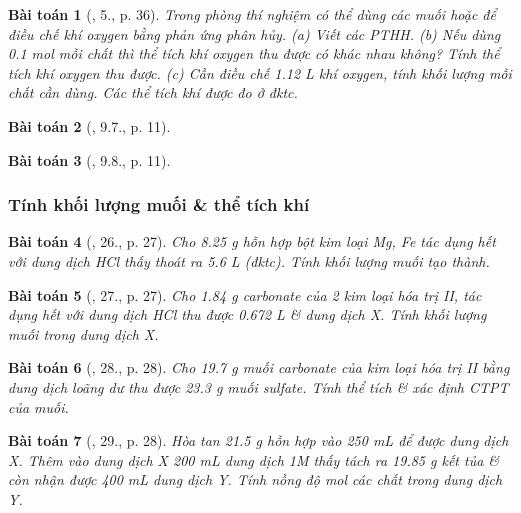 \documentclass{article}
\newtheorem{baitoan}{Bài toán}
\begin{document}
\begin{baitoan}[\cite{SGK_Hoa_Hoc_9}, 5., p. 36]
	Trong phòng thí nghiệm có thể dùng các muối \emph{} hoặc \emph{} để điều chế khí oxygen bằng phản ứng phân hủy. (a) Viết các PTHH. (b) Nếu dùng \emph{0.1 mol} mỗi chất thì thể tích khí oxygen thu được có khác nhau không? Tính thể tích khí oxygen thu được. (c) Cần điều chế \emph{1.12 L} khí oxygen, tính khối lượng mỗi chất cần dùng. Các thể tích khí được đo ở đktc.
\end{baitoan}

\begin{baitoan}[\cite{SBT_Hoa_Hoc_9}, 9.7., p. 11]
	
\end{baitoan}

\begin{baitoan}[\cite{SBT_Hoa_Hoc_9}, 9.8., p. 11]
	
\end{baitoan}

\subsubsection{Tính khối lượng muối \& thể tích khí }

\begin{baitoan}[\cite{An_350_BT_Hoa_Hoc_9}, 26., p. 27]
	Cho \emph{8.25 g} hỗn hợp bột kim loại \emph{Mg, Fe} tác dụng hết với dung dịch \emph{HCl} thấy thoát ra \emph{5.6 L } (đktc). Tính khối lượng muối tạo thành.
\end{baitoan}

\begin{baitoan}[\cite{An_350_BT_Hoa_Hoc_9}, 27., p. 27]
	Cho \emph{1.84 g} carbonate của 2 kim loại hóa trị II, tác dụng hết với dung dịch \emph{HCl} thu được \emph{0.672 L } \& dung dịch X. Tính khối lượng muối trong dung dịch X.
\end{baitoan}

\begin{baitoan}[\cite{An_350_BT_Hoa_Hoc_9}, 28., p. 28]
	Cho \emph{19.7 g} muối carbonate của kim loại hóa trị II bằng dung dịch \emph{} loãng dư thu được \emph{23.3 g} muối sulfate. Tính thể tích \emph{} \& xác định CTPT của muối.
\end{baitoan}

\begin{baitoan}[\cite{An_350_BT_Hoa_Hoc_9}, 29., p. 28]
	Hòa tan \emph{21.5 g} hỗn hợp \emph{} vào \emph{250 mL } để được dung dịch X. Thêm vào dung dịch X \emph{200 mL} dung dịch \emph{ 1M} thấy tách ra \emph{19.85 g} kết tủa \& còn nhận được \emph{400 mL} dung dịch Y. Tính nồng độ mol các chất trong dung dịch Y.
\end{baitoan}
\end{document}
